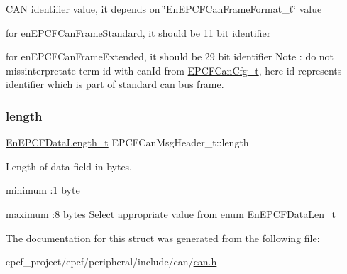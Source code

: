 C\+AN identifier value, it depends on \char`\"{}\+En\+E\+P\+C\+F\+Can\+Frame\+Format\+\_\+t\char`\"{} value
\begin{DoxyItemize}
\item for en\+E\+P\+C\+F\+Can\+Frame\+Standard, it should be 11 bit identifier
\item for en\+E\+P\+C\+F\+Can\+Frame\+Extended, it should be 29 bit identifier Note \+: do not missinterpretate term \textquotesingle{}id\textquotesingle{} with can\+Id from \mbox{\hyperlink{structEPCFCanCfg__t}{E\+P\+C\+F\+Can\+Cfg\+\_\+t}}, here id represents identifier which is part of standard can bus frame. 
\end{DoxyItemize}\mbox{\label{structEPCFCanMsgHeader__t_ae2e652a36b29fcb32ac8581e59114d08}} 
\subsubsection{\texorpdfstring{length}{length}}
{\footnotesize\ttfamily \mbox{\hyperlink{can_8h_a1a558e4259c2520bc9727ff9a8941fac}{En\+E\+P\+C\+F\+Data\+Length\+\_\+t}} E\+P\+C\+F\+Can\+Msg\+Header\+\_\+t\+::length}

Length of data field in bytes,
\begin{DoxyItemize}
\item minimum \+:1 byte
\item maximum \+:8 bytes Select appropriate value from enum En\+E\+P\+C\+F\+Data\+Len\+\_\+t 
\end{DoxyItemize}

The documentation for this struct was generated from the following file\+:\begin{DoxyCompactItemize}
\item 
epcf\+\_\+project/epcf/peripheral/include/can/\mbox{\hyperlink{can_8h}{can.\+h}}\end{DoxyCompactItemize}
